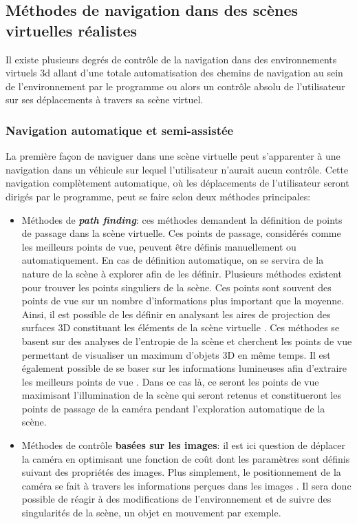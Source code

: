 \subsection{Méthodes de navigation dans des scènes virtuelles réalistes}

Il existe plusieurs degrés de contrôle de la navigation dans des environnements virtuels 3d allant d'une totale automatisation des chemins de navigation au sein de l'environnement par le programme ou alors un contrôle absolu de l'utilisateur sur ses déplacements à travers sa scène virtuel.

\subsubsection{Navigation automatique et semi-assistée}

La première façon de naviguer dans une scène virtuelle peut s'apparenter à une navigation dans un véhicule sur lequel l'utilisateur n'aurait aucun contrôle. Cette navigation complètement automatique, où les déplacements de l'utilisateur seront dirigés par le programme, peut se faire selon deux méthodes principales:

\begin{itemize}
	\item Méthodes de \textit{\textbf{path finding}}: ces méthodes demandent la définition de points de passage dans la scène virtuelle. Ces points de passage, considérés comme les meilleurs points de vue, peuvent être définis manuellement ou automatiquement. En cas de définition automatique, on se servira de la nature de la scène à explorer afin de les définir. Plusieurs méthodes existent pour trouver les points singuliers de la scène. Ces points sont souvent des points de vue sur un nombre d'informations plus important que la moyenne. Ainsi, il est possible de les définir en analysant les aires de projection des surfaces 3D constituant les éléments de la scène virtuelle \cite{vazquez2001viewpoint}. Ces méthodes se basent sur des analyses de l'entropie de la scène et cherchent les points de vue permettant de visualiser un maximum d'objets 3D en même temps. Il est également possible de se baser sur les informations lumineuses afin d'extraire les meilleurs points de vue \cite{gumhold2002maximum}. Dans ce cas là, ce seront les points de vue maximisant l'illumination de la scène qui seront retenus et constitueront les points de passage de la caméra pendant l'exploration automatique de la scène.
	\item Méthodes de contrôle \textbf{basées sur les images}: il est ici question de déplacer la caméra en optimisant une fonction de coût dont les paramètres sont définis suivant des propriétés des images. Plus simplement, le positionnement de la caméra se fait à travers les informations perçues dans les images \cite{courty2001computer}. Il sera donc possible de réagir à des modifications de l'environnement et de suivre des singularités de la scène, un objet en mouvement par exemple. 
\end{itemize}

